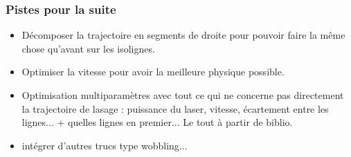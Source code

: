 \documentclass{beamer}
\begin{document}
	\begin{frame}
		\frametitle{Pistes pour la suite}
		\begin{itemize}
			\item Décomposer la trajectoire en segments de droite pour pouvoir faire la même chose qu'avant sur les isolignes.
			\item Optimiser la vitesse pour avoir la meilleure physique possible.
			\item Optimisation multiparamètres avec tout ce qui ne concerne pas directement la trajectoire de lasage : puissance du laser, vitesse, écartement entre les lignes... + quelles lignes en premier... Le tout à partir de biblio.
			\item intégrer d'autres trucs type wobbling...
		\end{itemize}
	\end{frame}
\end{document}
